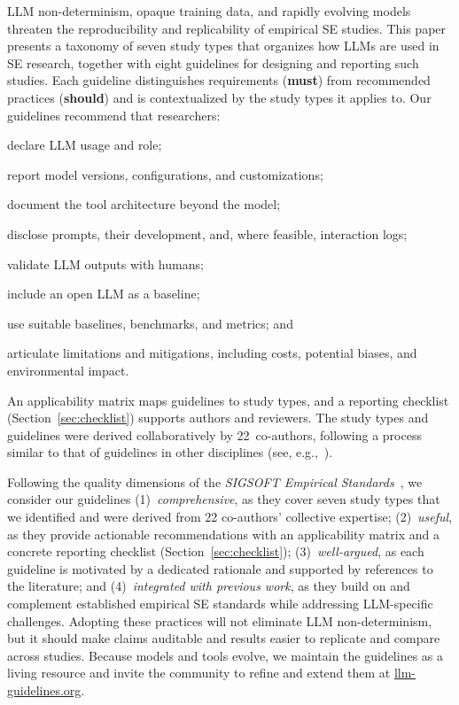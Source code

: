 \documentclass[smallextended]{svjour3}
\newcommand{\must}{\textbf{must}\xspace}
\newcommand{\should}{\textbf{should}\xspace}
\begin{document}
LLM non-determinism, opaque training data, and rapidly evolving models
threaten the reproducibility and replicability of empirical SE studies.
This paper presents a taxonomy of seven study types that organizes how
LLMs are used in SE research, together with eight guidelines for
designing and reporting such studies.
Each guideline distinguishes requirements (\must) from recommended
practices (\should) and is contextualized by the study types it
applies to.
Our guidelines recommend that researchers:
\begin{enumerate*}[label=(\arabic*)]
\item declare LLM usage and role;
\item report model versions, configurations, and customizations;
\item document the tool architecture beyond the model;
\item disclose prompts, their development, and, where feasible,
interaction logs;
\item validate LLM outputs with humans;
\item include an open LLM as a baseline;
\item use suitable baselines, benchmarks, and metrics; and
\item articulate limitations and mitigations, including costs, potential
biases, and environmental impact.
\end{enumerate*}
An applicability matrix maps guidelines to study types, and a reporting
checklist (Section~\ref{sec:checklist}) supports authors and reviewers.
The study types and guidelines were derived collaboratively by
22~co-authors, following a process similar to that of guidelines in
other disciplines (see, e.g.,~\cite{Begg1996}).

Following the quality dimensions of the \emph{SIGSOFT Empirical
Standards}~\cite{ralph2021empiricalstandardssoftwareengineering}, we
consider our guidelines
(1)~\emph{comprehensive}, as they cover seven study types that we
identified and were derived from 22 co-authors' collective expertise;
(2)~\emph{useful}, as they provide actionable recommendations with an
applicability matrix and a concrete reporting checklist
(Section~\ref{sec:checklist});
(3)~\emph{well-argued}, as each guideline is motivated by a dedicated
rationale and supported by references to the literature; and
(4)~\emph{integrated with previous work}, as they build on and
complement established empirical SE standards while addressing
LLM-specific challenges.
Adopting these practices will not eliminate LLM non-determinism, but it
should make claims auditable and results easier to replicate and compare
across studies.
Because models and tools evolve, we maintain the guidelines as a living
resource and invite the community to refine and extend them at
\href{https://llm-guidelines.org/}{llm-guidelines.org}.
\end{document}
